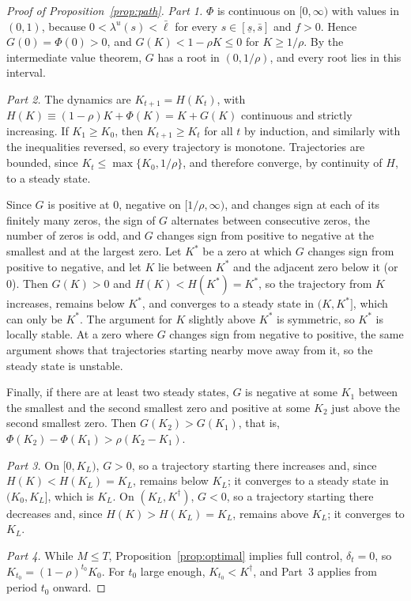 \documentclass[11pt,a4paper]{article}
\theoremstyle{plain}
\newcommand{\lbar}{\bar{\ell}}
\begin{document}
\begin{proof}[Proof of Proposition~\ref{prop:path}]
\emph{Part 1.} $\Phi$ is continuous on $[0, \infty)$ with values in $(0, 1)$, because $0 < \lambda^u(s) < \lbar$ for every $s \in [\underline s, \bar s]$ and $f > 0$. Hence $G(0) = \Phi(0) > 0$, and $G(K) < 1 - \rho K \le 0$ for $K \ge 1/\rho$. By the intermediate value theorem, $G$ has a root in $(0, 1/\rho)$, and every root lies in this interval.

\emph{Part 2.} The dynamics are $K_{t+1} = H(K_t)$, with $H(K) \equiv (1-\rho)K + \Phi(K) = K + G(K)$ continuous and strictly increasing. If $K_1 \ge K_0$, then $K_{t+1} \ge K_t$ for all $t$ by induction, and similarly with the inequalities reversed, so every trajectory is monotone. Trajectories are bounded, since $K_t \le \max\{K_0, 1/\rho\}$, and therefore converge, by continuity of $H$, to a steady state.

Since $G$ is positive at $0$, negative on $[1/\rho, \infty)$, and changes sign at each of its finitely many zeros, the sign of $G$ alternates between consecutive zeros, the number of zeros is odd, and $G$ changes sign from positive to negative at the smallest and at the largest zero. Let $K^*$ be a zero at which $G$ changes sign from positive to negative, and let $K$ lie between $K^*$ and the adjacent zero below it (or $0$). Then $G(K) > 0$ and $H(K) < H(K^*) = K^*$, so the trajectory from $K$ increases, remains below $K^*$, and converges to a steady state in $(K, K^*]$, which can only be $K^*$. The argument for $K$ slightly above $K^*$ is symmetric, so $K^*$ is locally stable. At a zero where $G$ changes sign from negative to positive, the same argument shows that trajectories starting nearby move away from it, so the steady state is unstable.

Finally, if there are at least two steady states, $G$ is negative at some $K_1$ between the smallest and the second smallest zero and positive at some $K_2$ just above the second smallest zero. Then $G(K_2) > G(K_1)$, that is, $\Phi(K_2) - \Phi(K_1) > \rho(K_2 - K_1)$.

\emph{Part 3.} On $[0, K_L)$, $G > 0$, so a trajectory starting there increases and, since $H(K) < H(K_L) = K_L$, remains below $K_L$; it converges to a steady state in $(K_0, K_L]$, which is $K_L$. On $(K_L, K^\dagger)$, $G < 0$, so a trajectory starting there decreases and, since $H(K) > H(K_L) = K_L$, remains above $K_L$; it converges to $K_L$.

\emph{Part 4.} While $M \le T$, Proposition~\ref{prop:optimal} implies full control, $\delta_t = 0$, so $K_{t_0} = (1-\rho)^{t_0} K_0$. For $t_0$ large enough, $K_{t_0} < K^\dagger$, and Part~3 applies from period $t_0$ onward.


\end{proof}
\end{document}
